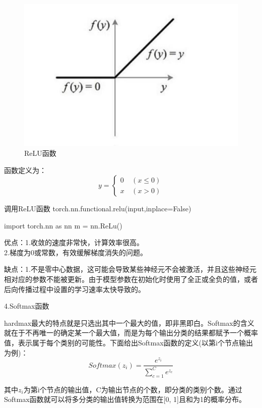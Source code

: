 \documentclass[openbib]{article}
\begin{document}
\begin{figure}[htbp]
	\centering
	\includegraphics[scale=0.32]{ReLU函数.jpeg}
	\caption{ReLU函数}
\end{figure}


函数定义为：
$$
y = \left\{ \begin{array}{cl}
	0 &  \ (x \le  0) \\
	x &  \ (x > 0)
\end{array} \right.
$$

\begin{Python}{调用ReLU函数}
torch.nn.functional.relu(input,inplace=False)
	
import torch.nn as nn
m = nn.ReLu()
\end{Python}

优点：1.收敛的速度非常快，计算效率很高。\\
2.梯度为0或常数，有效缓解梯度消失的问题。

缺点：1.不是零中心数据，这可能会导致某些神经元不会被激活，并且这些神经元相对应的参数不能被更新。由于模型参数在初始化时使用了全正或全负的值，或者后向传播过程中设置的学习速率太快导致的。

\begin{center}
	4.Softmax函数
\end{center}

hardmax最大的特点就是只选出其中一个最大的值，即非黑即白。Softmax的含义就在于不再唯一的确定某一个最大值，而是为每个输出分类的结果都赋予一个概率值，表示属于每个类别的可能性。下面给出Softmax函数的定义(以第i个节点输出为例)：
$$Softmax(z_i)=\frac{e^{z_i}}{\sum_{c=1}^{C}e^{z_c}}$$

其中$z_i$为第i个节点的输出值，C为输出节点的个数，即分类的类别个数。通过Softmax函数就可以将多分类的输出值转换为范围在[0, 1]且和为1的概率分布。
\end{document}
